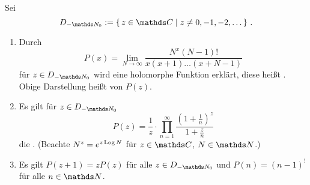 \begin{satz}\label{satz:gamma-fkt}
Sei
\[
	D_{-\NN_0}
	:= \Set{z\in\CC \mid z\not= 0, -1, -2, \ldots}
	\,.
\]
\begin{enumerate}
\item Durch
\[
	P(x)
	= \lim _ {N\to\infty} \frac{N^x(N-1)!}{x(x+1)\ldots(x+N-1)}
\]
für $z\in D_{-\NN_0}$ wird eine holomorphe Funktion erklärt, diese heißt . Obige Darstellung heißt  von $P(z)$.

\item Es gilt für $z\in D_{-\NN_0}$
\[
	P(z) = \frac{1}{z} \cdot \prod_{n=1}^\infty \frac{\left(1+\frac{1}{n}\right)^z}{1+\frac{z}{n}}
\]
die .
(Beachte $N^z = e^{z\operatorname{Log} N}$ für $z\in\CC$, $N \in \NN$.)
\item Es gilt $P(z+1) = zP(z)$ für alle $z\in D_{-\NN_0}$ und $P(n) = (n-1)^!$ für alle $n\in\NN$.
\end{enumerate}
\end{satz}

